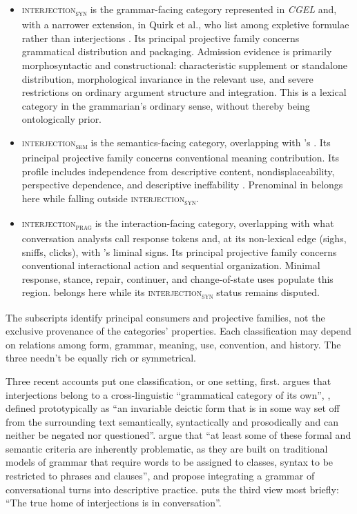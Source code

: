 \documentclass[12pt]{article}
\newcommand{\intj}[1]{\textsc{interjection\textsubscript{#1}}}
\begin{document}
\begin{itemize}
\item \intj{syn} is the grammar-facing category represented in
  \textit{CGEL} and, with a narrower extension, in Quirk et al., who list
   among expletive formulae rather than interjections
  \citep[852--853]{quirk1985}. Its principal projective family concerns
  grammatical distribution and packaging. Admission evidence is primarily
  morphosyntactic and constructional: characteristic supplement or
  standalone distribution, morphological invariance in the relevant use, and
  severe restrictions on ordinary argument structure and integration. This
  is a lexical category in the grammarian's ordinary sense, without thereby
  being ontologically prior.
\item \intj{sem} is the semantics-facing category, overlapping with
  \textcite{potts2007}'s . Its principal projective family
  concerns conventional meaning contribution. Its profile includes
  independence from descriptive content, nondisplaceability, perspective
  dependence, and descriptive ineffability \citep[166]{potts2007}.
  Prenominal  in  belongs here while
  falling outside \intj{syn}.
\item \intj{prag} is the interaction-facing category, overlapping with
  what conversation analysts call response tokens
  \citep[265]{dingemanse2024} and, at its non-lexical edge
  (sighs, sniffs, clicks), with \textcite{dingemanse2020}'s liminal signs.
  Its principal projective family
  concerns conventional interactional action and sequential organization.
  Minimal response, stance, repair, continuer, and change-of-state uses
  populate this region.  belongs here while its
  \intj{syn} status remains disputed.
\end{itemize}

The subscripts identify principal consumers and projective families, not the
exclusive provenance of the categories' properties. Each classification may
depend on relations among form, grammar, meaning, use, convention, and
history. The three needn't be equally rich or symmetrical.

Three recent accounts put one classification, or one setting, first.
\textcite[1, 7--8]{heine2023interactives} argues that interjections belong to
a cross-linguistic \enquote{grammatical category of its own},
, defined prototypically as \enquote{an invariable deictic
form that is in some way set off from the surrounding text semantically,
syntactically and prosodically and can neither be negated nor questioned}.
\textcite[159, 164]{mushin2023} argue that \enquote{at least some of these
formal and semantic criteria are inherently problematic, as they are built on
traditional models of grammar that require words to be assigned to classes,
syntax to be restricted to phrases and clauses}, and
propose integrating a grammar of conversational turns into descriptive
practice.
\textcite[4]{dingemanse2023preprint} puts the third view most briefly:
\enquote{The true home of interjections is in conversation}.
\end{document}
